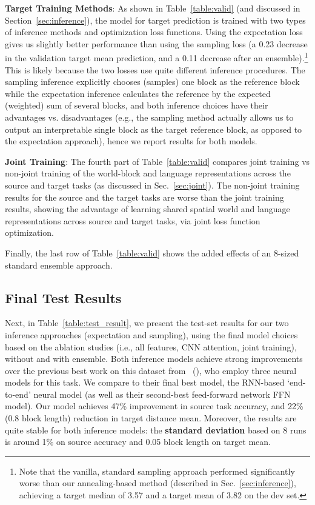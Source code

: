 \documentclass[letterpaper]{article} %
\newcommand{\newcite}[1]{\citeauthor{#1} (\citeyear{#1})}
\begin{document}
\textbf{Target Training Methods}:
As shown in Table~\ref{table:valid} (and discussed in Section~\ref{sec:inference}), the model for target prediction is trained with two types of inference methods and optimization loss functions. Using the expectation loss gives us slightly better performance than using the sampling loss (a 0.23 decrease in the validation target mean prediction, and a 0.11 decrease after an ensemble).\footnote{Note that the vanilla, standard sampling approach performed significantly worse than our annealing-based method (described in Sec.~\ref{sec:inference}), achieving a target median of 3.57 and a target mean of 3.82 on the dev set.}
This is likely because the two losses use quite different inference procedures. The sampling inference explicitly chooses (samples) one block as the reference block while the expectation inference calculates the reference by the expected (weighted) sum of several blocks, and both inference choices have their advantages vs. disadvantages (e.g., the sampling method actually allows us to output an interpretable single block as the target reference block, as opposed to the expectation approach), hence we report results for both models.


\textbf{Joint Training}:
The fourth part of Table~\ref{table:valid} compares  joint training vs non-joint training of the world-block and language representations across the source and target tasks (as discussed in Sec.~\ref{sec:joint}). The non-joint training results for the source and the target tasks are worse than the joint training results, showing the advantage of learning shared spatial world and language representations across source and target tasks, via joint loss function optimization.

Finally, the last row of Table~\ref{table:valid} shows the added effects of an 8-sized standard ensemble approach.


\subsection{Final Test Results}
\label{sec:finaltest}
Next, in Table~\ref{table:test_result}, we present the test-set results for our two inference approaches (expectation and sampling), using the final model choices based on the ablation studies (i.e., all features, CNN attention, joint training), without and with ensemble.
Both inference models achieve strong improvements over the previous best work on this dataset from~\newcite{bisk2016natural}, who employ three neural models for this task. We compare to their final best model, the RNN-based `end-to-end' neural model (as well as their second-best feed-forward network FFN model).
Our model achieves 47\% improvement in source task accuracy, and 22\% (0.8 block length) reduction in target distance mean.
Moreover, the results are quite stable for both inference models: the \textbf{standard deviation} based on 8 runs is around 1\% on source accuracy and 0.05 block length on target mean.
\end{document}

